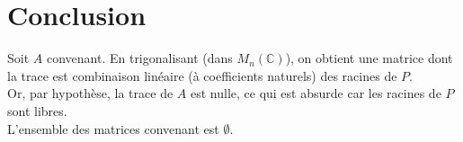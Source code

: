 \documentclass[a4paper, 12pt]{article}
\begin{document}
	
	\section{Conclusion}
	Soit $A$ convenant. En trigonalisant (dans $M_n(\mathbb C)$), on obtient une matrice dont la trace est combinaison linéaire (à coefficients naturels) des racines de $P$. \\
	Or, par hypothèse, la trace de $A$ est nulle, ce qui est absurde car les racines de $P$ sont libres. \\
	L'ensemble des matrices convenant est $\emptyset$.
	
\end{document}
